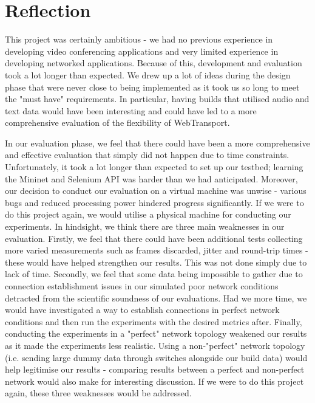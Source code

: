 \section{Reflection}
This project was certainly ambitious - we had no previous experience in developing video conferencing applications and very limited experience in developing networked applications. Because of this, development and evaluation took a lot longer than expected. We drew up a lot of ideas during the design phase that were never close to being implemented as it took us so long to meet the "must have" requirements. In particular, having builds that utilised audio and text data would have been interesting and could have led to a more comprehensive evaluation of the flexibility of WebTransport. 

In our evaluation phase, we feel that there could have been a more comprehensive and effective evaluation that simply did not happen due to time constraints. Unfortunately, it took a lot longer than expected to set up our testbed; learning the Mininet and Selenium API was harder than we had anticipated. Moreover, our decision to conduct our evaluation on a virtual machine was unwise - various bugs and reduced processing power hindered progress significantly. If we were to do this project again, we would utilise a physical machine for conducting our experiments.
In hindsight, we think there are three main weaknesses in our evaluation. Firstly, we feel that there could have been additional tests collecting more varied measurements such as frames discarded, jitter and round-trip times - these would have helped strengthen our results. This was not done simply due to lack of time. Secondly, we feel that some data being impossible to gather due to connection establishment issues in our simulated poor network conditions detracted from the scientific soundness of our evaluations. Had we more time, we would have investigated a way to establish connections in perfect network conditions and then run the experiments with the desired metrics after. Finally, conducting the experiments in a "perfect" network topology weakened our results as it made the experiments less realistic. Using a non-"perfect" network topology (i.e. sending large dummy data through switches alongside our build data) would help legitimise our results - comparing results between a perfect and non-perfect network would also make for interesting discussion. If we were to do this project again, these three weaknesses would be addressed.

